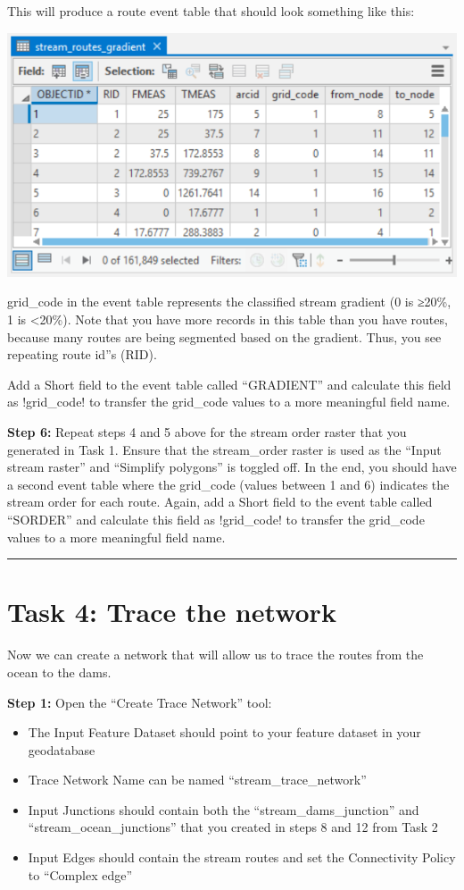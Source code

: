 \documentclass[
]{book}
\begin{document}
This will produce a route event table that should look something like this:

\includegraphics[width=0.5\linewidth]{images/02-stream-routes-gradient}

grid\_code in the event table represents the classified stream gradient (0 is ≥20\%, 1 is \textless20\%). Note that you have more records in this table than you have routes, because many routes are being segmented based on the gradient. Thus, you see repeating route id''s (RID).

Add a Short field to the event table called ``GRADIENT'' and calculate this field as !grid\_code! to transfer the grid\_code values to a more meaningful field name.

\textbf{Step 6:} Repeat steps 4 and 5 above for the stream order raster that you generated in Task 1. Ensure that the stream\_order raster is used as the ``Input stream raster'' and ``Simplify polygons'' is toggled off. In the end, you should have a second event table where the grid\_code (values between 1 and 6) indicates the stream order for each route. Again, add a Short field to the event table called ``SORDER'' and calculate this field as !grid\_code! to transfer the grid\_code values to a more meaningful field name.

\begin{center}\rule{0.5\linewidth}{0.5pt}\end{center}

\hypertarget{task-4-trace-the-network}{%
\section*{Task 4: Trace the network}\label{task-4-trace-the-network}}

Now we can create a network that will allow us to trace the routes from the ocean to the dams.

\textbf{Step 1:} Open the ``Create Trace Network'' tool:

\begin{itemize}
\item
  The Input Feature Dataset should point to your feature dataset in your geodatabase
\item
  Trace Network Name can be named ``stream\_trace\_network''
\item
  Input Junctions should contain both the ``stream\_dams\_junction'' and ``stream\_ocean\_junctions'' that you created in steps 8 and 12 from Task 2
\item
  Input Edges should contain the stream routes and set the Connectivity Policy to ``Complex edge''
\end{itemize}
\end{document}
